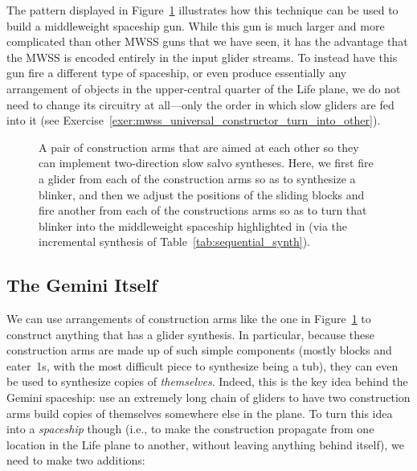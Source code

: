 The pattern displayed in Figure~\ref{fig:mwss_universal_constructor} illustrates how this technique can be used to build a middleweight spaceship gun. While this gun is much larger and more complicated than other MWSS guns that we have seen, it has the advantage that the MWSS is encoded entirely in the input glider streams. To instead have this gun fire a different type of spaceship, or even produce essentially any arrangement of objects in the upper-central quarter of the Life plane, we do not need to change its circuitry at all---only the order in which slow gliders are fed into it (see Exercise~\ref{exer:mwss_universal_constructor_turn_into_other}).

\begin{figure}[!htb]
	\centering
	\caption{A pair of construction arms that are aimed at each other so they can implement two-direction slow salvo syntheses. Here, we first fire a glider from each of the construction arms so as to synthesize a blinker, and then we adjust the positions of the sliding blocks and fire another from each of the constructions arms so as to turn that blinker into the middleweight spaceship highlighted in  (via the incremental synthesis of Table~\ref{tab:sequential_synth}).}\label{fig:mwss_universal_constructor}
\end{figure}


\subsection{The Gemini Itself}\label{sec:gemini_itself}

We can use arrangements of construction arms like the one in Figure~\ref{fig:mwss_universal_constructor} to construct anything that has a glider synthesis. In particular, because these construction arms are made up of such simple components (mostly blocks and eater~1s, with the most difficult piece to synthesize being a tub), they can even be used to synthesize copies of \emph{themselves}. Indeed, this is the key idea behind the Gemini spaceship: use an extremely long chain of gliders to have two construction arms build copies of themselves somewhere else in the plane. To turn this idea into a \emph{spaceship} though (i.e., to make the construction propagate from one location in the Life plane to another, without leaving anything behind itself), we need to make two additions:\smallskip

